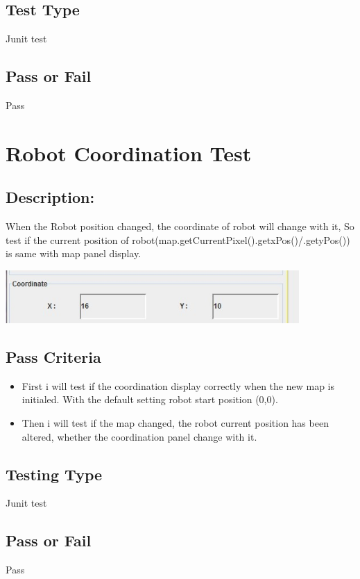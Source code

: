 \documentclass[11pt, a4paper]{report}
\begin{document}
\subsection{Test Type}
Junit test
\subsection{Pass or Fail}
Pass
\section{Robot Coordination Test}
\subsection{Description:}
When the Robot position changed, the coordinate of robot will change with it, So test if the current position of robot(map.getCurrentPixel().getxPos()/.getyPos()) is same with map panel display.
\begin{center}
  \includegraphics[width=11.20cm]{coordinate}
\end{center}
\subsection{Pass Criteria}
\begin{itemize}
\item First i will test if the coordination display correctly when the new map is initialed. With the default setting robot start position (0,0).
\item Then i will test if the map changed, the robot current position has been altered, whether the coordination panel change with it.
\end{itemize}
\subsection{Testing Type}
Junit test
\subsection{Pass or Fail}
Pass

\newpage
\appendix
\end{document}
